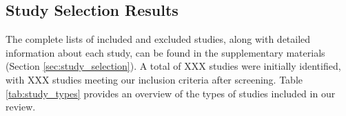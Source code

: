 \subsection{Study Selection Results}
\label{sec:study_selection_results}
The complete lists of included and excluded studies, along with detailed information about each study, can be found in the supplementary materials (Section \ref{sec:study_selection}). A total of XXX studies were initially identified, with XXX studies meeting our inclusion criteria after screening. Table \ref{tab:study_types} provides an overview of the types of studies included in our review.


